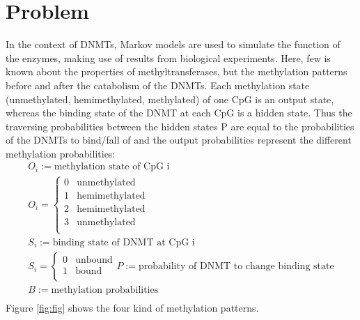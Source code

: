 \section{Problem} 
\label{section:Problem}
In the context of \acp{DNMT}, Markov models are used to simulate the function of the enzymes, making use of results from biological experiments. Here, few is known about the properties of methyltransferases, but the methylation patterns before and after the catabolism of the \acp{DNMT}. Each methylation state (unmethylated, hemimethylated, methylated) of one \ac{CpG} is an output state, whereas the binding state of the \ac{DNMT} at each \ac{CpG} is a hidden state. Thus the traversing probabilities between the hidden states P are equal to the probabilities of the \acp{DNMT} to bind/fall of and the output probabilities represent the different methylation probabilities:\newline
\begin{align}
O_i := \text{methylation state of CpG i}\\
O_i = \left\{
\begin{array}{ll}
0 & \text{unmethylated} \\
1 & \text{hemimethylated} \\
2 & \text{hemimethylated} \\
3 & \text{unmethylated} \\
\end{array}
\right.\\
S_i := \text{binding state of DNMT at CpG i}\\
S_i = \left\{
\begin{array}{ll}
0 & \text{unbound} \\
1 & \text{bound} \\
\end{array}
\right.
P := \text{probability of DNMT to change binding state}\\
B := \text{methylation probabilities}\\
\end{align}
Figure \ref{fig:fig} shows the four kind of methylation patterns.\\
